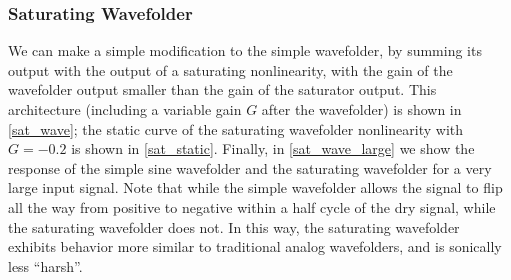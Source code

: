 \documentclass[twoside,a4paper]{article}
\begin{document}
\subsubsection{Saturating Wavefolder}
%
We can make a simple modification to the simple wavefolder, by summing
its output with the output of a saturating nonlinearity, with the gain
of the wavefolder output smaller than the gain of the saturator output.
This architecture (including a variable gain $G$ after the wavefolder) is
shown in \cref{sat_wave}; the static curve of the saturating wavefolder
nonlinearity with $G=-0.2$ is shown in \cref{sat_static}. Finally, in
\cref{sat_wave_large} we show the response of the simple sine wavefolder
and the saturating wavefolder for a very large input signal. Note that
while the simple wavefolder allows the signal to flip all the way from
positive to negative within a half cycle of the dry signal, while the
saturating wavefolder does not. In this way, the saturating wavefolder
exhibits behavior more similar to traditional analog wavefolders, and
is sonically less ``harsh''.
%
\end{document}
